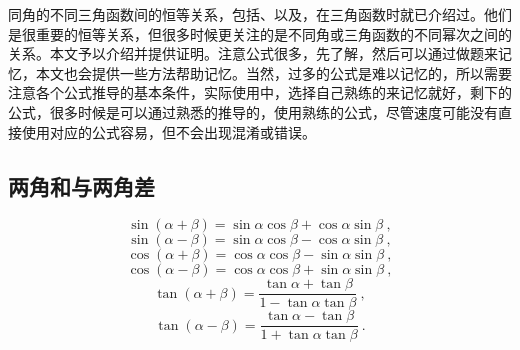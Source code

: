 
\begin{issues}
\issueDraft
{}
\end{issues}


同角的不同三角函数间的恒等关系，包括、以及，在三角函数时就已介绍过。他们是很重要的恒等关系，但很多时候更关注的是不同角或三角函数的不同幂次之间的关系。本文予以介绍并提供证明。注意公式很多，先了解，然后可以通过做题来记忆，本文也会提供一些方法帮助记忆。当然，过多的公式是难以记忆的，所以需要注意各个公式推导的基本条件，实际使用中，选择自己熟练的来记忆就好，剩下的公式，很多时候是可以通过熟悉的推导的，使用熟练的公式，尽管速度可能没有直接使用对应的公式容易，但不会出现混淆或错误。

\subsection{两角和与两角差}
\begin{equation}\label{eq_HsAnTf_5}
\sin(\alpha + \beta) = \sin\alpha \cos\beta + \cos\alpha \sin\beta~,
\end{equation}
\begin{equation}\label{eq_HsAnTf_6}
\sin(\alpha - \beta) = \sin\alpha \cos\beta - \cos\alpha \sin\beta~,
\end{equation}
\begin{equation}\label{eq_HsAnTf_4}
\cos(\alpha + \beta) = \cos\alpha \cos\beta - \sin\alpha \sin\beta~,
\end{equation}
\begin{equation}\label{eq_HsAnTf_3}
\cos(\alpha - \beta) = \cos\alpha \cos\beta + \sin\alpha \sin\beta~,
\end{equation}
\begin{equation}\label{eq_HsAnTf_7}
\tan(\alpha + \beta) = \frac{\tan\alpha+\tan\beta}{1-\tan\alpha \tan\beta}~,
\end{equation}
\begin{equation}\label{eq_HsAnTf_8}
\tan(\alpha - \beta) = \frac{\tan\alpha - \tan\beta}{1+\tan\alpha \tan\beta}~.
\end{equation}

